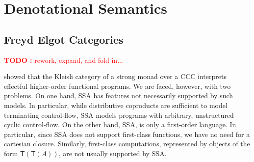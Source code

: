 \documentclass[acmsmall,screen,review]{acmart}
\newcounter{todos}
\newcommand{\TODO}[1]{{
  \stepcounter{todos}
  \begin{center}\large{\textcolor{red}{\textbf{TODO \arabic{todos}:} #1}}\end{center}
}}
\newcommand{\ms}[1]{\ensuremath{\mathsf{#1}}}
\begin{document}
\section{Denotational Semantics}

\label{sec:densem}

\subsection{Freyd Elgot Categories}

\TODO{rework, expand, and fold in...}

\citet{moggi-91-monad} showed that the Kleisli category of a strong monad over a CCC interprets
effectful higher-order functional programs. We are faced, however, with two problems. On one hand,
SSA has features not necessarily supported by such models. In particular, while distributive
coproducts are sufficient to model terminating control-flow, SSA models programs with arbitrary,
unstructured cyclic control-flow. On the other hand, SSA, is only a first-order language. In
particular, since SSA does not support first-class functions, we have no need for a cartesian
closure. Similarly, first-class computations, represented by objects of the form
$\ms{T}(\ms{T}(A))$, are not usually supported by SSA.
\end{document}
